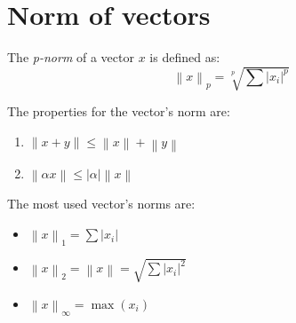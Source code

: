 \section{Norm of vectors}

\begin{definition}
    The \emph{p-norm} of a vector $x$ is defined as: 
    \[\left\lVert x \right\rVert_p=\sqrt[p]{\sum{\left\lvert x_i \right\rvert^p }}\]
\end{definition}
The properties for the vector's norm are: 
\begin{enumerate}
    \item $\left\lVert x+y \right\rVert \leq \left\lVert x \right\rVert + \left\lVert y \right\rVert$
    \item $\left\lVert \alpha x \right\rVert \leq \left\lvert \alpha \right\rvert \left\lVert x \right\rVert$
\end{enumerate}
The most used vector's norms are: 
\begin{itemize}
    \item $\left\lVert x \right\rVert_1=\sum{\left\lvert x_i \right\rvert}$
    \item $\left\lVert x \right\rVert_2=\left\lVert x \right\rVert=\sqrt{\sum{\left\lvert x_i \right\rvert^2}}$
    \item $\left\lVert x \right\rVert_{\infty}=\max{\left(x_i\right)}$
\end{itemize}